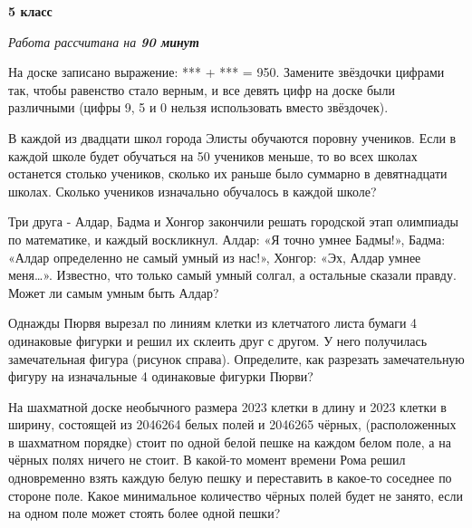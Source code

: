 \hspace{3mm}

\centerline{\bf \huge 5 класс}
\centerline{\normalsize{\it Работа рассчитана на \bf{90} минут}}


 На доске записано выражение: *** + *** = 950. Замените звёздочки цифрами так, чтобы равенство стало верным, и все девять цифр на доске были различными (цифры 9, 5 и 0 нельзя использовать вместо звёздочек).

\hspace{3mm}

 В каждой из двадцати школ города Элисты обучаются поровну учеников. Если в каждой школе будет обучаться на 50 учеников меньше, то во всех школах останется столько учеников, сколько их раньше было суммарно в девятнадцати школах. Сколько учеников изначально обучалось в каждой школе?

\hspace{3mm}

 Три друга - Алдар, Бадма и Хонгор закончили решать городской этап олимпиады по математике, и каждый воскликнул. Алдар: «Я точно умнее Бадмы!», Бадма: «Алдар определенно не самый умный из нас!», Хонгор: «Эх, Алдар умнее меня…». Известно, что только самый умный солгал, а остальные сказали правду. Может ли самым умным быть Алдар?

\hspace{3mm}


Однажды Пюрвя вырезал по линиям клетки из клетчатого листа бумаги 4 одинаковые фигурки и решил их склеить друг с другом. У него получилась замечательная фигура (рисунок справа). Определите, как разрезать замечательную фигуру на изначальные 4 одинаковые фигурки Пюрви?

\hspace{3mm}

 На шахматной доске необычного размера 2023 клетки в длину и 2023 клетки в ширину, состоящей из 2046264 белых полей и 2046265 чёрных, (расположенных в шахматном порядке) стоит по одной белой пешке на каждом белом поле, а на чёрных полях ничего не стоит. В какой-то момент времени Рома решил одновременно взять каждую белую пешку и переставить в какое-то соседнее по стороне поле. Какое минимальное количество чёрных полей будет не занято, если на одном поле может стоять более одной пешки?
